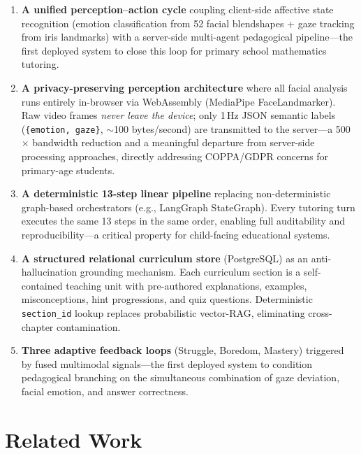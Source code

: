 \documentclass[conference, letterpaper]{IEEEtran}
\begin{document}
\begin{enumerate}[label=(\arabic*)]
    \item \textbf{A unified perception--action cycle} coupling client-side affective state recognition (emotion classification from 52 facial blendshapes + gaze tracking from iris landmarks) with a server-side multi-agent pedagogical pipeline---the first deployed system to close this loop for primary school mathematics tutoring.

    \item \textbf{A privacy-preserving perception architecture} where all facial analysis runs entirely in-browser via WebAssembly (MediaPipe FaceLandmarker). Raw video frames \emph{never leave the device}; only 1\,Hz JSON semantic labels (\texttt{\{emotion, gaze\}}, $\sim$100 bytes/second) are transmitted to the server---a 500$\times$ bandwidth reduction and a meaningful departure from server-side processing approaches, directly addressing COPPA/GDPR concerns for primary-age students.

    \item \textbf{A deterministic 13-step linear pipeline} replacing non-deterministic graph-based orchestrators (e.g., LangGraph StateGraph). Every tutoring turn executes the same 13 steps in the same order, enabling full auditability and reproducibility---a critical property for child-facing educational systems.

    \item \textbf{A structured relational curriculum store} (PostgreSQL) as an anti-hallucination grounding mechanism. Each curriculum section is a self-contained teaching unit with pre-authored explanations, examples, misconceptions, hint progressions, and quiz questions. Deterministic \texttt{section\_id} lookup replaces probabilistic vector-RAG, eliminating cross-chapter contamination.

    \item \textbf{Three adaptive feedback loops} (Struggle, Boredom, Mastery) triggered by fused multimodal signals---the first deployed system to condition pedagogical branching on the simultaneous combination of gaze deviation, facial emotion, and answer correctness.
\end{enumerate}

\section{Related Work}
\end{document}
